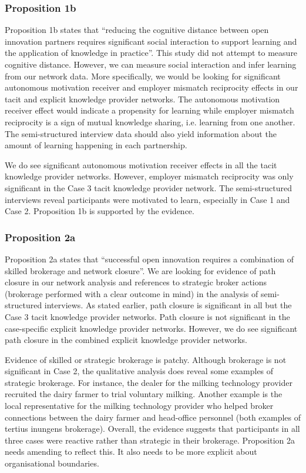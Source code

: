 \subsubsection{Proposition 1b}

Proposition 1b states that \enquote{reducing the cognitive distance between open innovation partners requires significant social interaction to support learning and the application of knowledge in practice}. This study did not attempt to measure cognitive distance. However, we can measure social interaction and infer learning from our network data. More specifically, we would be looking for significant autonomous motivation receiver and employer mismatch reciprocity effects in our tacit and explicit knowledge provider networks. The autonomous motivation receiver effect would indicate a propensity for learning while employer mismatch reciprocity is a sign of mutual knowledge sharing, i.e. learning from one another. The semi-structured interview data should also yield information about the amount of learning happening in each partnership. \medskip

We do see significant autonomous motivation receiver effects in all the tacit knowledge provider networks. However, employer mismatch reciprocity was only significant in the Case 3 tacit knowledge provider network. The semi-structured interviews reveal participants were motivated to learn, especially in Case 1 and Case 2. Proposition 1b is supported by the evidence. 

\subsubsection{Proposition 2a}

Proposition 2a states that \enquote{successful open innovation requires a combination of skilled brokerage and network closure}. We are looking for evidence of path closure in our network analysis and references to strategic broker actions (brokerage performed with a clear outcome in mind) in the analysis of semi-structured interviews. As stated earlier, path closure is significant in all but the Case 3 tacit knowledge provider networks. Path closure is not significant in the case-specific explicit knowledge provider networks. However, we do see significant path closure in the combined explicit knowledge provider networks. \medskip

Evidence of skilled or strategic brokerage is patchy. Although brokerage is not significant in Case 2, the qualitative analysis does reveal some examples of strategic brokerage. For instance, the dealer for the milking technology provider recruited the dairy farmer to trial voluntary milking. Another example is the local representative for the milking technology provider who helped broker connections between the dairy farmer and head-office personnel (both examples of tertius inungens brokerage). Overall, the evidence suggests that participants in all three cases were reactive rather than strategic in their brokerage. Proposition 2a needs amending to reflect this. It also needs to be more explicit about organisational boundaries. 

